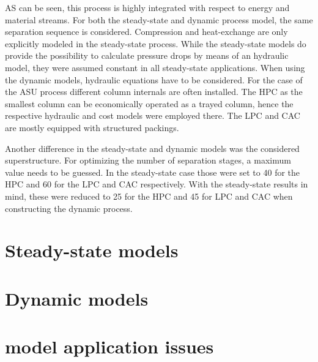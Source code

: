         AS can be seen, this process is highly integrated with respect to energy and material streams. For both the
        steady-state and dynamic process model, the same separation sequence is considered. Compression and heat-exchange 
        are only explicitly modeled in the steady-state process. While the steady-state models do provide the possibility 
        to calculate pressure drops by means of an hydraulic model, they were assumed constant in all steady-state applications. 
        When using the dynamic models, hydraulic equations have to be considered. For the case of the ASU process different column 
        internals are often installed. The HPC as the smallest column can be economically operated as a trayed column, hence the 
        respective hydraulic and cost models were employed there. The LPC and CAC are mostly equipped with structured 
        packings. 
        
        Another difference in the steady-state and dynamic models was the considered superstructure. For optimizing the number 
        of separation stages, a maximum value needs to be guessed. In the steady-state case those were set to 40 for the HPC
        and 60 for the LPC and CAC respectively. With the steady-state results in mind, these were reduced to 25 for the HPC
        and 45 for LPC and CAC when constructing the dynamic process.  

    \section{Steady-state models}
        

    \section{Dynamic models}
        
        
    \section{model application issues}
        
